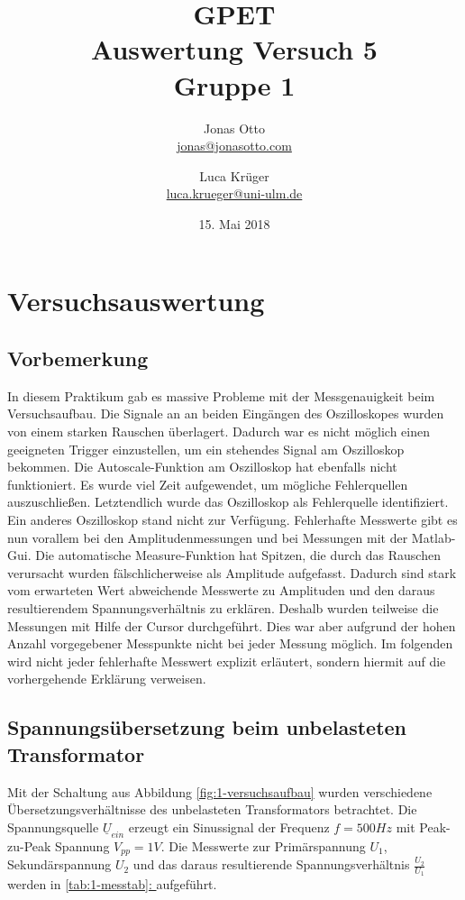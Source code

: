 \documentclass[a4paper]{article}
\title{GPET\\ Auswertung Versuch 5\\ Gruppe 1}
\author{Jonas Otto\\ \href{mailto:jonas@jonasotto.com}{jonas@jonasotto.com} 
   \and Luca Krüger \\ \href{mailto:luca.krueger@uni-ulm.de}{luca.krueger@uni-ulm.de} }
\date{15. Mai 2018}
\newcommand*{\fullref}[1]{\hyperref[{#1}]{\autoref*{#1}: \nameref*{#1}}}
\begin{document}
    
\maketitle
\newpage
\section{Versuchsauswertung}
\subsection{Vorbemerkung}
In diesem Praktikum gab es massive Probleme mit der Messgenauigkeit beim Versuchsaufbau. Die Signale an an beiden Eingängen des Oszilloskopes wurden von einem starken Rauschen überlagert. Dadurch war es nicht möglich einen geeigneten Trigger einzustellen, um ein stehendes Signal am Oszilloskop bekommen. Die Autoscale-Funktion am Oszilloskop hat ebenfalls nicht funktioniert. Es wurde viel Zeit aufgewendet, um mögliche Fehlerquellen auszuschließen.
Letztendlich wurde das Oszilloskop als Fehlerquelle identifiziert. Ein anderes Oszilloskop stand nicht zur Verfügung.
Fehlerhafte Messwerte gibt es nun vorallem bei den Amplitudenmessungen und bei Messungen mit der Matlab-Gui. 
Die automatische Measure-Funktion hat Spitzen, die durch das Rauschen verursacht wurden fälschlicherweise als Amplitude aufgefasst. Dadurch sind stark vom erwarteten Wert abweichende Messwerte zu Amplituden und den daraus resultierendem Spannungsverhältnis zu erklären.
Deshalb wurden teilweise die Messungen  mit Hilfe der Cursor durchgeführt. Dies war aber aufgrund der hohen Anzahl vorgegebener Messpunkte nicht bei jeder Messung möglich.
Im folgenden wird nicht jeder fehlerhafte Messwert explizit erläutert, sondern hiermit auf die vorhergehende Erklärung verweisen.
\subsection{Spannungsübersetzung beim unbelasteten Transformator} 
\label{subsec:Versuch1-unbelastet}

Mit der Schaltung aus Abbildung \ref{fig:1-versuchsaufbau} wurden verschiedene Übersetzungsverhältnisse des unbelasteten Transformators betrachtet.
Die Spannungsquelle $\underline{U}_\textit{ein}$ erzeugt ein Sinussignal der Frequenz $f=500\si{Hz}$ mit Peak-zu-Peak Spannung $V_\textit{pp}=1\si{V}$.
Die Messwerte zur Primärspannung $U_1$, Sekundärspannung $U_2$ und das daraus resultierende Spannungsverhältnis $\frac{U_2}{U_1}$ werden in \fullref{tab:1-messtab} aufgeführt.\
\end{document}

